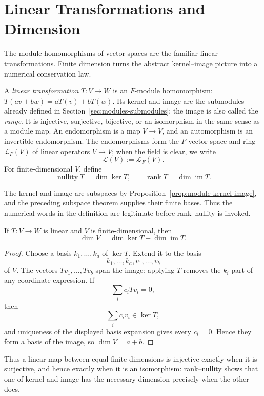\section{Linear Transformations and Dimension}
The module homomorphisms of vector spaces are the familiar linear
transformations. Finite dimension turns the abstract kernel--image picture
into a numerical conservation law.

\begin{definition}
A \emph{linear transformation} \(T:V\to W\) is an \(F\)-module
homomorphism: \(T(av+bw)=aT(v)+bT(w)\). Its kernel and image are the
submodules already defined in Section~\ref{sec:modules-submodules}; the image
is also called the
\emph{range}. It is injective, surjective, bijective, or
an isomorphism in the same sense as a module map. An endomorphism is a map
\(V\to V\), and an automorphism is an invertible endomorphism. The
endomorphisms form the \(F\)-vector space and ring \(\mathcal{L}_F(V)\) of
linear operators \(V\to V\); when the field is clear, we write
\[
\mathcal{L}(V):=\mathcal{L}_F(V).
\]
For finite-dimensional \(V\), define
\[
\operatorname{nullity}T=\dim\ker T,
\qquad
\operatorname{rank}T=\dim\operatorname{im}T.
\]
\end{definition}

The kernel and image are subspaces by
Proposition~\ref{prop:module-kernel-image}, and the preceding subspace theorem
supplies their finite bases. Thus the numerical words in the definition are
legitimate before rank--nullity is invoked.

\begin{theorem}
If \(T:V\to W\) is linear and \(V\) is finite-dimensional, then
\[\dim V=\dim\ker T+\dim\operatorname{im}T.\]
\end{theorem}
\begin{proof}
Choose a basis \(k_1,\ldots,k_a\) of \(\ker T\). Extend it to the basis
\[
k_1,\ldots,k_a,v_1,\ldots,v_b
\]
of \(V\). The vectors \(Tv_1,\ldots,Tv_b\)
span the image: applying \(T\) removes the \(k_i\)-part of any coordinate
expression. If
\[
\sum_i c_iTv_i=0,
\]
then
\[
\sum_i c_iv_i\in\ker T,
\]
and
uniqueness of the displayed basis expansion gives every \(c_i=0\). Hence
they form a basis of the image, so \(\dim V=a+b\).
\end{proof}

Thus a linear map between equal finite dimensions is injective exactly when
it is surjective, and hence exactly when it is an isomorphism: rank--nullity
shows that one of kernel and image has the necessary dimension precisely when
the other does.

